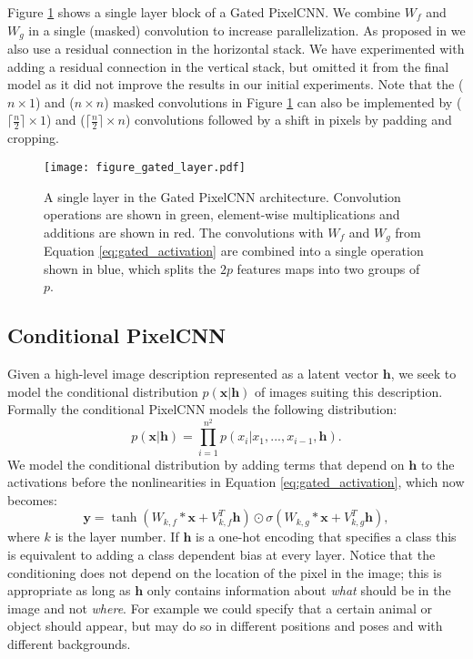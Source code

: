 \documentclass{article}
\renewcommand{\vec}{\mathbf}
\begin{document}
Figure \ref{fig:layer} shows a single layer block of a Gated PixelCNN. We combine $W_f$ and $W_g$ in a single (masked) convolution to increase parallelization. As proposed in \cite{van2016pixel} we also use a residual connection \cite{resnets} in the horizontal stack. We have  experimented with adding a residual connection in the vertical stack, but omitted it from the final model as it did not improve the results in our initial experiments. Note that the ($n \times 1$) and ($n \times n$) masked convolutions in Figure \ref{fig:layer} can also be implemented by ($\lceil \frac{n}{2} \rceil \times 1$) and ($\lceil \frac{n}{2} \rceil \times n$) convolutions followed by a shift in pixels by padding and cropping.

\begin{figure}[h]
  \centering
  \texttt{[image: figure\_gated\_layer.pdf]}
  \hspace{50pt}

  \caption{A single layer in the Gated PixelCNN architecture. Convolution operations are shown in green, element-wise multiplications and additions are shown in red. The convolutions with $W_f$ and $W_g$ from Equation \ref{eq:gated_activation} are combined into a single operation shown in blue, which splits the $2p$ features maps into two groups of $p$.}
  \label{fig:layer}
\end{figure}

\subsection{Conditional PixelCNN}

Given a high-level image description represented as a latent vector $\vec{h}$, we seek to model the conditional distribution $p(\vec{x}|\vec{h})$ of images suiting this description. 
Formally the conditional PixelCNN models the following distribution:
\begin{equation}
p(\vec{x}|\vec{h}) = \prod_{i=1}^{n^2} p(x_i | x_1,...,x_{i-1}, \vec{h}) .
\end{equation}
We model the conditional distribution by adding terms that depend on $\vec{h}$ to the activations before the nonlinearities in Equation \ref{eq:gated_activation}, which now becomes:
\begin{equation}
\vec{y} = \tanh (W_{k,f} \ast \vec{x} + V_{k, f}^T \vec{h}) \odot \sigma(W_{k,g} \ast \vec{x} + V_{k, g}^T \vec{h}), \label{biased_activation}
\end{equation}
where $k$ is the layer number. If $\vec{h}$ is a one-hot encoding that specifies a class this is equivalent to adding a class dependent bias at every layer. Notice that the conditioning does not depend on the location of the pixel in the image; this is appropriate as long as $\vec{h}$ only contains information about \emph{what} should be in the image and not \emph{where}. For example we could specify that a certain animal or object should appear, but may do so in different positions and poses and with different backgrounds.
\end{document}
